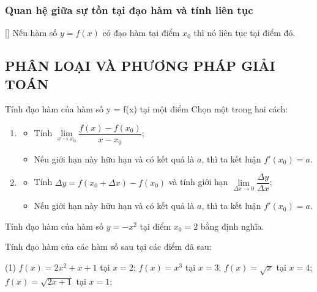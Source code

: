 \subsubsection{Quan hệ giữa sự tồn tại đạo hàm và tính liên tục}
[\iconMT]  Nếu hàm số  $y=f(x)$  có đạo hàm tại điểm $x_0$   thì nó liên tục tại điểm đó.

\subsection{PHÂN LOẠI VÀ PHƯƠNG PHÁP GIẢI TOÁN}

\begin{dang}{Tính đạo hàm của hàm số y = f(x) tại một điểm}
	Chọn một trong hai cách:
	\begin{enumerate}[\iconCH]
		\item {}
		\begin{itemize}
			\item [$\bullet$] Tính $\lim\limits_{x\to x_0}\dfrac{f(x)-f(x_0)}{x-x_0}$;
			\item [$\bullet$] Nếu giới hạn này hữu hạn và có kết quả là $a$, thì ta kết luận $f'(x_0)=a$.
		\end{itemize}
		\item {}
		\begin{itemize}
			\item [$\bullet$] Tính $\Delta y=f(x_0+\Delta x)-f(x_0)$ và tính giới hạn $\lim\limits_{\Delta x \to 0}\dfrac{\Delta y}{\Delta x}$;
			\item [$\bullet$] Nếu giới hạn này hữu hạn và có kết quả là $a$, thì ta kết luận $f'(x_0)=a$.
		\end{itemize}
	\end{enumerate}
\end{dang}

\begin{vd}%
	Tính đạo hàm của hàm số $y=-x^2$ tại điểm $x_0=2$ bằng định nghĩa.
	\loigiai{
	}
\end{vd}

\begin{vd}%
	Tính đạo hàm của các hàm số sau tại các điểm đã sau:
	\begin{tasks}(1)
		\task $f(x)=2x^2+x+1$ tại $x=2$;
		\task $f(x)=x^3$ tại $x=3$;
		\task $f(x)=\sqrt{x}$ tại $x=4$;
		\task $f(x)=\sqrt{2x+1}$ tại $x=1$;
	\end{tasks}
	\loigiai{
		
	}
\end{vd}

